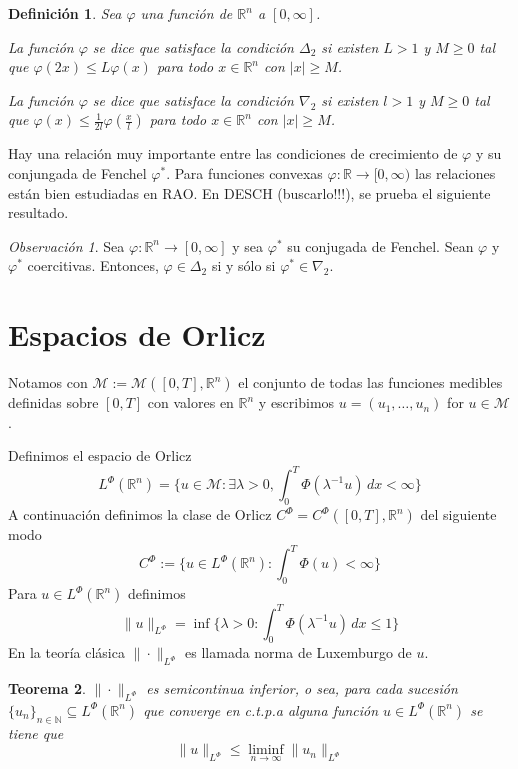 \documentclass[a4paper,11pt]{amsart}
\theoremstyle{plain}
\newtheorem{thm}{Teorema}[section]
\newtheorem{defi}[thm]{Definici\'on}
\theoremstyle{remark}
\newtheorem{rem}{Observaci\'on}
\theoremstyle{remark}
\newcommand{\rr}{\mathbb{R}}
\newcommand{\nn}{\mathbb{N}}
\numberwithin{equation}{section}
\begin{document}
\begin{defi}
Sea $\varphi$ una funci\'on de $\rr^n$ a $[0,\infty]$.

La funci\'on $\varphi$ se dice que satisface la condici\'on $\Delta_2$ si existen $L>1$ y $M\geq 0$ tal que 
$\varphi(2x)\leq L \varphi(x)$ para todo $x \in \rr^n$ con $|x|\geq M$.

La funci\'on $\varphi$ se dice que satisface la condici\'on $\nabla_2$ si existen $l>1$ y $M\geq 0$ tal que 
$\varphi(x)\leq \frac{1}{2l} \varphi(\frac{x}{l})$ para todo $x \in \rr^n$ con $|x|\geq M$.
\end{defi}

Hay una relaci\'on muy importante entre las condiciones de crecimiento de $\varphi$ y su conjungada de Fenchel $\varphi^*$. 
Para funciones convexas $\varphi:\rr\to [0,\infty)$ las relaciones est\'an bien estudiadas en RAO. 
En DESCH (buscarlo!!!), se prueba el siguiente resultado.

\begin{rem}
Sea $\varphi:\rr^n  \to [0,\infty]$ y sea $\varphi^*$ su conjugada de Fenchel.
Sean $\varphi$ y $\varphi^*$ coercitivas. Entonces, 
$\varphi \in \Delta_2$ si y s\'olo si $\varphi^* \in \nabla_2$.
\end{rem}


\section{Espacios de Orlicz}
Notamos con $\mathcal{M}:=\mathcal{M}([0,T],\rr^n)$  el conjunto de todas las funciones medibles definidas sobre $[0,T]$ con valores en $\mathbb{R}^n$ y escribimos $u=(u_1,\dots,u_n)$ for  $u\in \mathcal{M}$. 

Definimos el espacio de Orlicz
\[
L^{\Phi}(\rr^n)=\{ u \in \mathcal{M}: \exists \lambda>0, \int_0^T \Phi(\lambda^{-1}u)\,dx<\infty  \}
\]
A continuaci\'on definimos la clase de Orlicz $C^{\Phi}=C^{\Phi}([0,T],\rr^n)$ del siguiente modo
\[
C^{\Phi}:=\{u \in L^{\Phi}(\rr^n):\int_0^T \Phi(u)<\infty\}
\]
Para $u \in L^{\Phi}(\rr^n)$ definimos
\[
\| u \|_{L^{\Phi}}=\inf\{   \lambda>0:\int_0^T \Phi(\lambda^{-1}u)\,dx\leq 1\}
\]
En la teor\'ia cl\'asica $\|\cdot\|_{L^{\Phi}}$ es llamada norma de Luxemburgo de $u$.

\begin{thm}
$\|\cdot\|_{L^{\Phi}}$ es semicontinua inferior, o sea, para cada sucesi\'on $\{u_n\}_{n\in \nn}\subseteq L^{\Phi}(\rr^n)$ que converge en c.t.p.a alguna funci\'on $u \in L^{\Phi}(\rr^n)$ se tiene que 
\[
\|u\|_{L^{\Phi}}\leq \liminf \limits_{n \to \infty} \| u_n\|_{L^{\Phi}}
\]
\end{thm}
\end{document}
